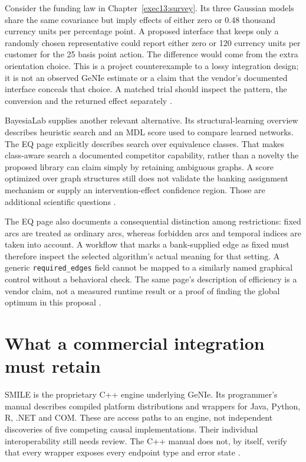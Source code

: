 Consider the funding law in Chapter~\ref{exec13:survey}. Its three Gaussian
models share the same covariance but imply effects of either zero or 0.48
thousand currency units per percentage point. A proposed interface that keeps
only a randomly chosen representative could report either zero or 120 currency
units per customer for the 25 basis point action. The difference would come
from the extra orientation choice. This is a project counterexample to a
lossy integration design; it is not an observed GeNIe estimate or a claim
that the vendor's documented interface conceals that choice. A matched trial
should inspect the pattern, the conversion and the returned effect separately
\citep{exec13_examples}.

BayesiaLab supplies another relevant alternative. Its structural-learning
overview describes heuristic search and an MDL score used to compare learned
networks. The EQ page explicitly describes search over equivalence classes.
That makes class-aware search a documented competitor capability, rather
than a novelty the proposed library can claim simply by retaining ambiguous
graphs. A score optimized over graph structures still does not validate
the banking assignment mechanism or supply an intervention-effect confidence
region. Those are additional scientific questions
\citep{exec13_bayesia_structure,exec13_bayesia_eq}.

The EQ page also documents a consequential distinction among restrictions:
fixed arcs are treated as ordinary arcs, whereas forbidden arcs and temporal
indices are taken into account. A workflow that marks a bank-supplied edge
as fixed must therefore inspect the selected algorithm's actual meaning for
that setting. A generic \texttt{required\_edges} field cannot be mapped to a
similarly named graphical control without a behavioral check. The same page's
description of efficiency is a vendor claim, not a measured runtime result
or a proof of finding the global optimum in this proposal
\citep{exec13_bayesia_eq}.

\section{What a commercial integration must retain}

SMILE is the proprietary C++ engine underlying GeNIe. Its programmer's manual
describes compiled platform distributions and wrappers for Java, Python, R,
.NET and COM. These are access paths to an engine, not independent discoveries
of five competing causal implementations. Their individual interoperability
still needs review. The C++ manual does not, by itself, verify that every
wrapper exposes every endpoint type and error state
\citep{exec13_smile_intro}.

